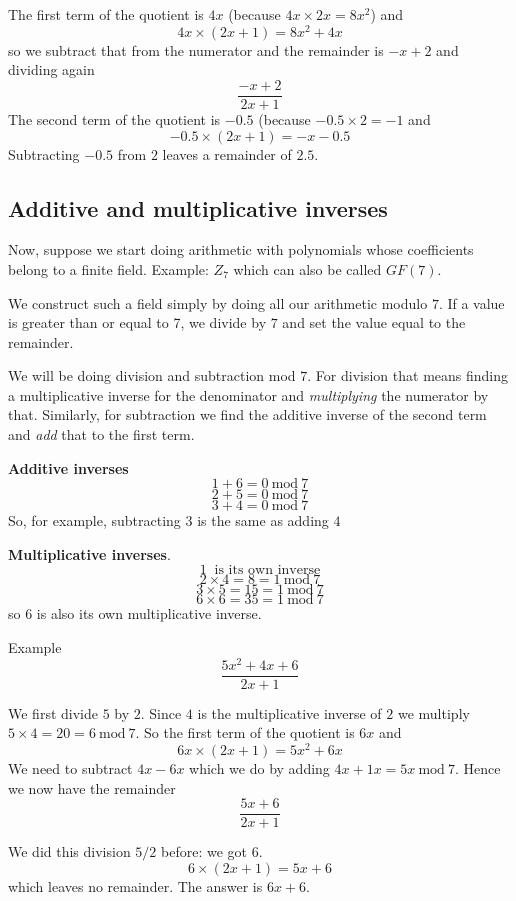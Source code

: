 \documentclass[11pt, oneside]{article}
\begin{document}
The first term of the quotient is $4x$ (because $4x \times 2x = 8x^2$) and 
\[ 4x \times (2x+1) = 8x^2 + 4x \]
so we subtract that from the numerator and the remainder is $-x + 2$ and dividing again
\[ \frac{-x + 2}{2x + 1} \]
The second term of the quotient is $-0.5$ (because $-0.5 \times 2 = -1$ and
\[ -0.5 \times (2x + 1) = -x - 0.5 \]
Subtracting $-0.5$ from $2$ leaves a remainder of $2.5$.

\subsection*{Additive and multiplicative inverses}

Now, suppose we start doing arithmetic with polynomials whose coefficients belong to a finite field.  Example:  $Z_7$ which can also be called $GF(7)$.

We construct such a field simply by doing all our arithmetic modulo $7$.  If a value is greater than or equal to 7, we divide by $7$ and set the value equal to the remainder.

We will be doing division and subtraction mod $7$.  For division that means finding a multiplicative inverse for the denominator and \emph{multiplying} the numerator by that.  Similarly, for subtraction we find the additive inverse of the second term and \emph{add} that to the first term.

\textbf{Additive inverses}
\[ 1 + 6 = 0 \  \text{mod} \  7 \]
\[ 2 + 5 = 0 \  \text{mod} \  7 \]
\[ 3 + 4 = 0 \  \text{mod} \  7 \]
So, for example, subtracting $3$ is the same as adding $4$

\textbf{Multiplicative inverses}.
\[ 1 \ \text{ is its own inverse} \]
\[ 2 \times 4 = 8  = 1 \  \text{mod} \  7 \]
\[ 3 \times 5 = 15 = 1 \  \text{mod} \  7 \]
\[ 6 \times 6 = 35 = 1 \  \text{mod} \  7 \]
so $6$ is also its own multiplicative inverse.

Example
\[ \frac{5x^2 + 4x + 6}{2x + 1} \]

We first divide $5$ by $2$.  Since $4$ is the multiplicative inverse of $2$ we multiply $5 \times 4 = 20 = 6  \  \text{mod} \ 7$.  So the first term of the quotient is $6x$ and
\[ 6x \times (2x + 1) = 5x^2 + 6x \]
We need to subtract $4x-6x$ which we do by adding $4x + 1x = 5x  \  \text{mod} \  7$.  Hence we now have the remainder
\[ \frac{5x + 6}{2x + 1} \]

We did this division $5/2$ before:  we got $6$.
\[ 6 \times (2x + 1) = 5x + 6 \]
which leaves no remainder.  The answer is $6x + 6$.
\end{document}
